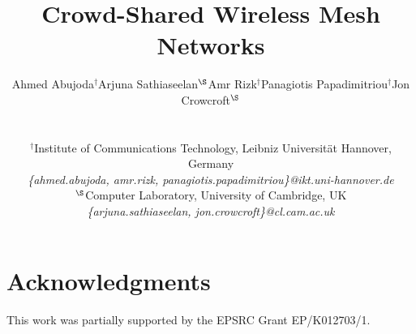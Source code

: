 \documentclass[conference]{IEEEtran}
\begin{document}
\title{Crowd-Shared Wireless Mesh Networks}

\author{
\begin{tabular}{ccccc}
\multicolumn{1}{c}{Ahmed Abujoda$^{\dagger}$} &
\multicolumn{1}{c}{Arjuna Sathiaseelan$^{\S}$} &
\multicolumn{1}{c}{Amr Rizk$^{\dagger}$} &
\multicolumn{1}{c}{Panagiotis Papadimitriou$^{\dagger}$} &
\multicolumn{1}{c}{Jon Crowcroft$^{\S}$} \\ 
\end{tabular}\\
\\
$^{\dagger}$Institute of Communications Technology, Leibniz Universit\"at Hannover, Germany\\
\textit{\footnotesize{\{ahmed.abujoda, amr.rizk, panagiotis.papadimitriou\}@ikt.uni-hannover.de}}\\
$^{\S}$Computer Laboratory, University of Cambridge, UK\\
\textit{\footnotesize{\{arjuna.sathiaseelan, jon.crowcroft\}@cl.cam.ac.uk}} \\
}

\maketitle

\begin{abstract}

\end{abstract}






\section{Acknowledgments}
This work was partially supported by the EPSRC Grant EP/K012703/1. %
\end{document}
